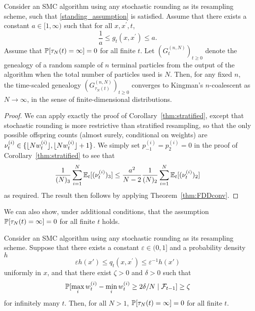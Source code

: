 \begin{corollary}\label{thm:stochrounding}
Consider an SMC algorithm using any stochastic rounding as its resampling scheme, such that \ref{standing_assumption} is satisfied.
Assume that there exists a constant $a\in [1,\infty)$ such that for all $x, x^\prime, t$,
\begin{equation*}
\frac{1}{a} \leq g_t(x, x^\prime) \leq a . 
\end{equation*}
Assume that $\mathbb{P}[ \tau_N(t) = \infty] =0$ for all finite $t$.
Let $(G_t^{(n,N)})_{t\geq0}$ denote the genealogy of a random sample of $n$ terminal particles from the output of the algorithm when the total number of particles used is $N$. Then, for any fixed $n$, the time-scaled genealogy $(G_{\tau_N(t)}^{(n,N)})_{t\geq0}$ converges to Kingman's $n$-coalescent as $N\to \infty$, in the sense of finite-dimensional distributions.
\end{corollary}

\begin{proof}
We can apply exactly the proof of Corollary~\ref{thm:stratified}, except that stochastic rounding is more restrictive than stratified resampling, so that the only possible offspring counts (almost surely, conditional on weights) are $\nu_t^{(i)} \in \{ \lfloor N w_t^{(i)} \rfloor, \lfloor N w_t^{(i)} \rfloor +1 \}$. We simply set $p_{-1}^{(i)} = p_{2}^{(i)} = 0$ in the proof of Corollary~\ref{thm:stratified} to see that
\begin{equation*}
\frac{1}{(N)_3} \sum_{i=1}^{N} \mathbb{E}_t [(\nu_t^{(i)})_3 ]
\leq \frac{a^2}{N-2} \frac{1}{(N)_2} \sum_{i=1}^{N} \mathbb{E}_t [(\nu_t^{(i)})_2 ]
\end{equation*}
as required.
The result then follows by applying Theorem~\ref{thm:FDDconv}.
\end{proof}


We can also show, under additional conditions, that the assumption $\mathbb{P}[ \tau_N(t) = \infty ] =0$ for all finite $t$ holds.

\begin{prop}\label{thm:SR_nontriviality}
Consider an SMC algorithm using any stochastic rounding as its resampling scheme.
Suppose that there exists a constant $\varepsilon \in (0,1]$ and a probability density $h$
\begin{equation*}
\varepsilon h(x') \leq q_t(x, x^\prime) \leq \varepsilon^{-1} h(x')
\end{equation*}
uniformly in $x$, and that there exist $\zeta >0$ and $\delta >0$ such that 
\begin{equation*}
\mathbb{P}[ \max_i w_t^{(i)} - \min_i w_t^{(i)} \geq 2\delta/N \mid \mathcal{F}_{t-1} ] \geq \zeta
\end{equation*}
 for infinitely many $t$. Then, for all $N>1$, $\mathbb{P}[ \tau_N(t) = \infty ] =0$ for all finite $t$.
\end{prop}

